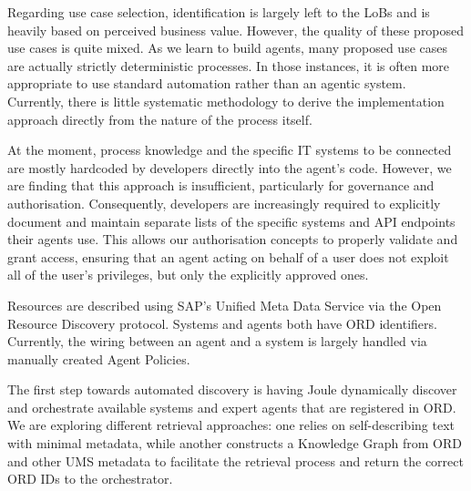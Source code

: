 Regarding use case selection, identification is largely left to the LoBs and is heavily based on perceived business value. However, the quality of these proposed use cases is quite mixed. As we learn to build agents, many proposed use cases are actually strictly deterministic processes. In those instances, it is often more appropriate to use standard automation rather than an agentic system. Currently, there is little systematic methodology to derive the implementation approach directly from the nature of the process itself.

\medskip{}

At the moment, process knowledge and the specific IT systems to be connected are mostly hardcoded by developers directly into the agent's code. However, we are finding that this approach is insufficient, particularly for governance and authorisation. Consequently, developers are increasingly required to explicitly document and maintain separate lists of the specific systems and API endpoints their agents use. This allows our authorisation concepts to properly validate and grant access, ensuring that an agent acting on behalf of a user does not exploit all of the user's privileges, but only the explicitly approved ones.

\medskip{}

Resources are described using SAP's Unified Meta Data Service via the Open Resource Discovery protocol. Systems and agents both have ORD identifiers. Currently, the wiring between an agent and a system is largely handled via manually created Agent Policies.

\medskip{}

The first step towards automated discovery is having Joule dynamically discover and orchestrate available systems and expert agents that are registered in ORD. We are exploring different retrieval approaches: one relies on self-describing text with minimal metadata, while another constructs a Knowledge Graph from ORD and other UMS metadata to facilitate the retrieval process and return the correct ORD IDs to the orchestrator.

\medskip{}

